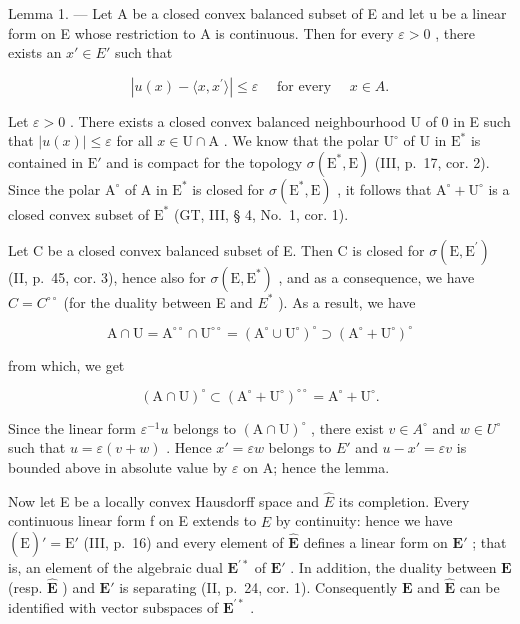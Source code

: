 Lemma 1. --- Let A be a closed convex balanced subset of E and let u be a linear form on E whose restriction to A is continuous. Then for every \(\varepsilon > 0\) , there exists an \(x' \in E'\) such that

\[
\left| u (x) - \langle x, x ^ {\prime} \rangle \right| \leqslant \varepsilon \quad \text { for   every } \quad x \in A.
\]

Let \(\varepsilon > 0\) . There exists a closed convex balanced neighbourhood U of 0 in E such that \(|u(x)| \leqslant \varepsilon\) for all \(x \in \mathrm{U} \cap \mathrm{A}\) . We know that the polar \(\mathrm{U}^{\circ}\) of U in \(\mathrm{E}^{*}\) is contained in \(\mathrm{E}'\) and is compact for the topology \(\sigma(\mathrm{E}^{*}, \mathrm{E})\) (III, p.~17, cor. 2). Since the polar \(\mathrm{A}^{\circ}\) of A in \(\mathrm{E}^{*}\) is closed for \(\sigma(\mathrm{E}^{*}, \mathrm{E})\) , it follows that \(\mathrm{A}^{\circ} + \mathrm{U}^{\circ}\) is a closed convex subset of \(\mathrm{E}^{*}\) (GT, III, § 4, No.~1, cor. 1).

Let C be a closed convex balanced subset of E. Then C is closed for \(\sigma(\mathrm{E},\mathrm{E}^{\prime})\) (II, p.~45, cor. 3), hence also for \(\sigma(\mathrm{E},\mathrm{E}^{*})\) , and as a consequence, we have \(C = C^{\circ\circ}\) (for the duality between E and \(E^{*}\) ). As a result, we have

\[
\mathrm{A} \cap \mathrm{U} = \mathrm{A} ^ {\circ \circ} \cap \mathrm{U} ^ {\circ \circ} = (\mathrm{A} ^ {\circ} \cup \mathrm{U} ^ {\circ}) ^ {\circ} \supset (\mathrm{A} ^ {\circ} + \mathrm{U} ^ {\circ}) ^ {\circ}
\]

from which, we get

\[
(\mathrm{A} \cap \mathrm{U}) ^ {\circ} \subset (\mathrm{A} ^ {\circ} + \mathrm{U} ^ {\circ}) ^ {\circ \circ} = \mathrm{A} ^ {\circ} + \mathrm{U} ^ {\circ}.
\]

Since the linear form \(\varepsilon^{-1}u\) belongs to \((\mathrm{A}\cap\mathrm{U})^{\circ}\) , there exist \(v\in A^{\circ}\) and \(w\in U^{\circ}\) such that \(u=\varepsilon(v+w)\) . Hence \(x'=\varepsilon w\) belongs to \(E'\) and \(u-x'=\varepsilon v\) is bounded above in absolute value by \(\varepsilon\) on A; hence the lemma.

Now let E be a locally convex Hausdorff space and \(\hat{E}\) its completion. Every continuous linear form f on E extends to \(\hat{E}\) by continuity: hence we have \((\hat{\mathrm{E}})' = \mathrm{E}'\) (III, p.~16) and every element of \(\hat{\mathbf{E}}\) defines a linear form on \(\mathbf{E}'\) ; that is, an element of the algebraic dual \(\mathbf{E}^{\prime *}\) of \(\mathbf{E}'\) . In addition, the duality between \(\mathbf{E}\) (resp. \(\hat{\mathbf{E}}\) ) and \(\mathbf{E}'\) is separating (II, p.~24, cor. 1). Consequently \(\mathbf{E}\) and \(\hat{\mathbf{E}}\) can be identified with vector subspaces of \(\mathbf{E}^{\prime *}\) .

